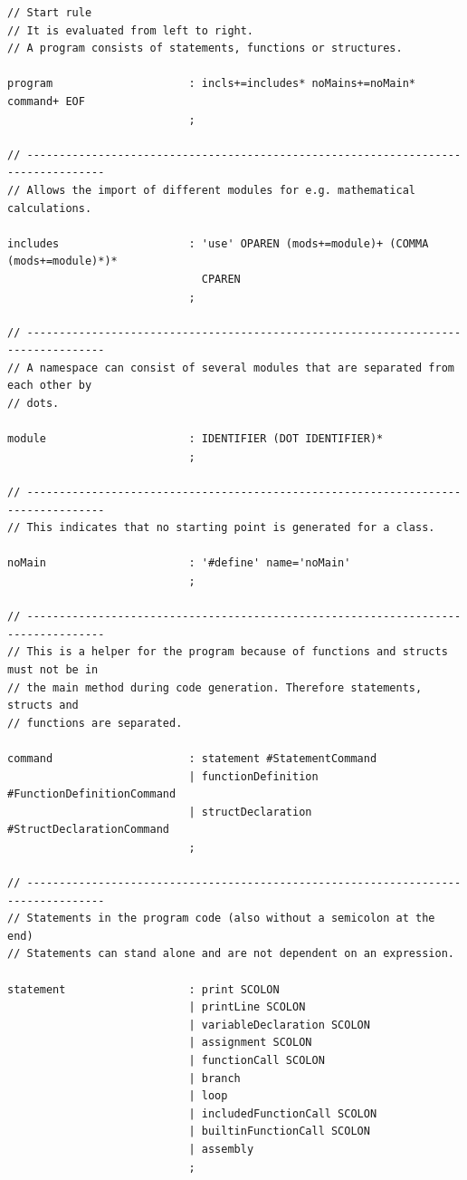 \begin{lstlisting}[frame=htrbl, caption={Parser rules of grammar {\ttfamily E}}, label={lst:pe}, basicstyle=\scriptsize]
// Start rule
// It is evaluated from left to right.
// A program consists of statements, functions or structures.

program                     : incls+=includes* noMains+=noMain* command+ EOF
                            ;

// ----------------------------------------------------------------------------------
// Allows the import of different modules for e.g. mathematical calculations.

includes                    : 'use' OPAREN (mods+=module)+ (COMMA (mods+=module)*)*
                              CPAREN
                            ;

// ----------------------------------------------------------------------------------
// A namespace can consist of several modules that are separated from each other by 
// dots.

module                      : IDENTIFIER (DOT IDENTIFIER)*
                            ;

// ----------------------------------------------------------------------------------
// This indicates that no starting point is generated for a class.

noMain                      : '#define' name='noMain'
                            ;

// ----------------------------------------------------------------------------------
// This is a helper for the program because of functions and structs must not be in 
// the main method during code generation. Therefore statements, structs and 
// functions are separated.

command                     : statement #StatementCommand
                            | functionDefinition #FunctionDefinitionCommand
                            | structDeclaration #StructDeclarationCommand
                            ;

// ----------------------------------------------------------------------------------
// Statements in the program code (also without a semicolon at the end)
// Statements can stand alone and are not dependent on an expression.

statement                   : print SCOLON
                            | printLine SCOLON
                            | variableDeclaration SCOLON
                            | assignment SCOLON
                            | functionCall SCOLON
                            | branch
                            | loop
                            | includedFunctionCall SCOLON
                            | builtinFunctionCall SCOLON
                            | assembly
                            ;


\end{lstlisting}
